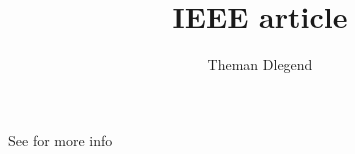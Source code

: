 \documentclass{IEEEtran}
\title{IEEE article}
\author{Theman Dlegend}
\begin{document}
\maketitle
\lipsum[1]See \cite{893287} for more info 


\end{document}
